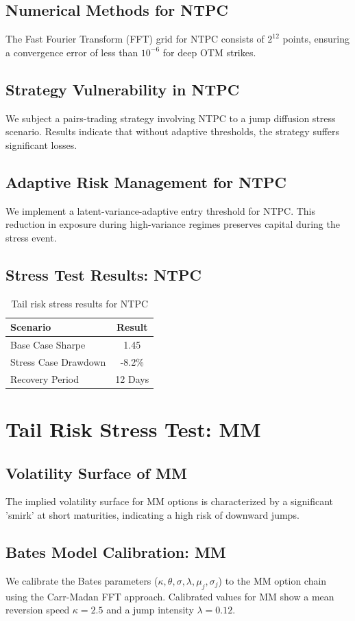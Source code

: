 \documentclass[12pt,a4paper,twoside]{article}
\begin{document}
\subsection{Numerical Methods for NTPC}
The Fast Fourier Transform (FFT) grid for NTPC consists of $2^{12}$ points, ensuring a convergence error of less than $10^{-6}$ for deep OTM strikes.
\subsection{Strategy Vulnerability in NTPC}
We subject a pairs-trading strategy involving NTPC to a jump diffusion stress scenario. Results indicate that without adaptive thresholds, the strategy suffers significant losses.
\subsection{Adaptive Risk Management for NTPC}
We implement a latent-variance-adaptive entry threshold for NTPC. This reduction in exposure during high-variance regimes preserves capital during the stress event.
\subsection{Stress Test Results: NTPC}
\begin{table}[H]
\centering
\begin{tabular}{|l|c|}
\hline
Scenario & Result \\
\hline
Base Case Sharpe & 1.45 \\
Stress Case Drawdown & -8.2\% \\
Recovery Period & 12 Days \\
\hline
\end{tabular}
\caption{Tail risk stress results for NTPC}
\end{table}
\newpage

\section{Tail Risk Stress Test: MM}
\subsection{Volatility Surface of MM}
The implied volatility surface for MM options is characterized by a significant 'smirk' at short maturities, indicating a high risk of downward jumps.
\subsection{Bates Model Calibration: MM}
We calibrate the Bates parameters ($\kappa, \theta, \sigma, \lambda, \mu_j, \sigma_j$) to the MM option chain using the Carr-Madan FFT approach.
Calibrated values for MM show a mean reversion speed $\kappa = 2.5$ and a jump intensity $\lambda = 0.12$.
\end{document}
